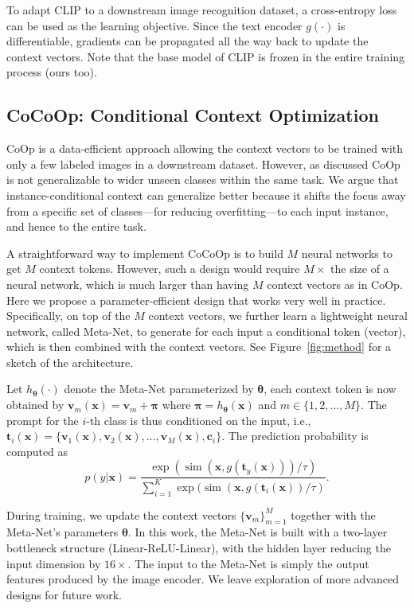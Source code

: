 \documentclass[10pt,twocolumn,letterpaper]{article}
\begin{document}
To adapt CLIP to a downstream image recognition dataset, a cross-entropy loss can be used as the learning objective. Since the text encoder $g(\cdot)$ is differentiable, gradients can be propagated all the way back to update the context vectors. Note that the base model of CLIP is frozen in the entire training process (ours too).

\subsection{CoCoOp: Conditional Context Optimization}
CoOp is a data-efficient approach allowing the context vectors to be trained with only a few labeled images in a downstream dataset. However, as discussed CoOp is not generalizable to wider unseen classes within the same task. We argue that instance-conditional context can generalize better because it shifts the focus away from a specific set of classes---for reducing overfitting---to each input instance, and hence to the entire task.

A straightforward way to implement CoCoOp is to build $M$ neural networks to get $M$ context tokens. However, such a design would require $M \times$ the size of a neural network, which is much larger than having $M$ context vectors as in CoOp. Here we propose a parameter-efficient design that works very well in practice. Specifically, on top of the $M$ context vectors, we further learn a lightweight neural network, called Meta-Net, to generate for each input a conditional token (vector), which is then combined with the context vectors. See Figure~\ref{fig:method} for a sketch of the architecture.

Let $h_{\bm{\theta}}(\cdot)$ denote the Meta-Net parameterized by $\bm{\theta}$, each context token is now obtained by $\bm{v}_m (\bm{x}) = \bm{v}_m + \bm{\pi}$ where $\bm{\pi} = h_{\bm{\theta}} (\bm{x})$ and $m \in \{1, 2, ..., M\}$. The prompt for the $i$-th class is thus conditioned on the input, i.e., $\bm{t}_i (\bm{x}) =\{\bm{v}_1 (\bm{x}), \bm{v}_2 (\bm{x}), \hdots, \bm{v}_M (\bm{x}), \bm{c}_i\}$. The prediction probability is computed as
\begin{equation} \label{eq:pred_cocoop}
p(y | \bm{x}) = \frac{\exp (\operatorname{sim} (\bm{x}, g(\bm{t}_y (\bm{x}))) / \tau)}{\sum_{i=1}^K \exp (\operatorname{sim} (\bm{x}, g(\bm{t}_i (\bm{x})) / \tau)}.
\end{equation}

During training, we update the context vectors $\{\bm{v}_m\}_{m=1}^M$ together with the Meta-Net's parameters $\bm{\theta}$. In this work, the Meta-Net is built with a two-layer bottleneck structure (Linear-ReLU-Linear), with the hidden layer reducing the input dimension by $16 \times$. The input to the Meta-Net is simply the output features produced by the image encoder. We leave exploration of more advanced designs for future work.
\end{document}
